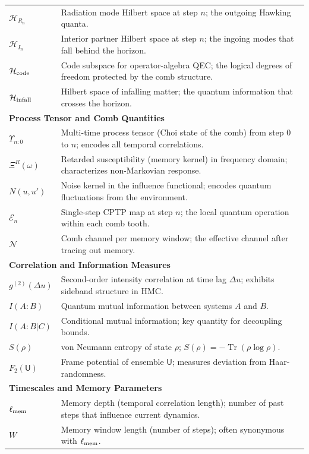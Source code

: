 \documentclass[a4paper,11pt]{article}
\newcommand{\HMC}{\textup{\textsc{HMC}}\xspace}
\newcommand{\Tr}{\operatorname{Tr}}
\theoremstyle{plain}
\theoremstyle{definition}
\theoremstyle{remark}
\begin{document}
\begin{longtable}{@{}lp{10cm}@{}}
$\mathcal{H}_{R_n}$ & Radiation mode Hilbert space at step $n$; the outgoing Hawking quanta. \\
$\mathcal{H}_{I_n}$ & Interior partner Hilbert space at step $n$; the ingoing modes that fall behind the horizon. \\
$\mathcal{H}_{\rm code}$ & Code subspace for operator-algebra QEC; the logical degrees of freedom protected by the comb structure. \\
$\mathcal{H}_{\rm infall}$ & Hilbert space of infalling matter; the quantum information that crosses the horizon. \\
\midrule
\multicolumn{2}{l}{\textbf{Process Tensor and Comb Quantities}} \\
\midrule
$\Upsilon_{n{:}0}$ & Multi-time process tensor (Choi state of the comb) from step 0 to $n$; encodes all temporal correlations. \\
$\Xi^R(\omega)$ & Retarded susceptibility (memory kernel) in frequency domain; characterizes non-Markovian response. \\
$N(u,u')$ & Noise kernel in the influence functional; encodes quantum fluctuations from the environment. \\
$\mathcal{E}_n$ & Single-step CPTP map at step $n$; the local quantum operation within each comb tooth. \\
$\mathcal{N}$ & Comb channel per memory window; the effective channel after tracing out memory. \\
\midrule
\multicolumn{2}{l}{\textbf{Correlation and Information Measures}} \\
\midrule
$g^{(2)}(\Delta u)$ & Second-order intensity correlation at time lag $\Delta u$; exhibits sideband structure in \HMC{}. \\
$I(A:B)$ & Quantum mutual information between systems $A$ and $B$. \\
$I(A:B|C)$ & Conditional mutual information; key quantity for decoupling bounds. \\
$S(\rho)$ & von Neumann entropy of state $\rho$; $S(\rho) = -\Tr(\rho \log \rho)$. \\
$F_2(\mathsf{U})$ & Frame potential of ensemble $\mathsf{U}$; measures deviation from Haar-randomness. \\
\midrule
\multicolumn{2}{l}{\textbf{Timescales and Memory Parameters}} \\
\midrule
$\ell_{\rm mem}$ & Memory depth (temporal correlation length); number of past steps that influence current dynamics. \\
$W$ & Memory window length (number of steps); often synonymous with $\ell_{\rm mem}$. \\

\end{longtable}
\end{document}
